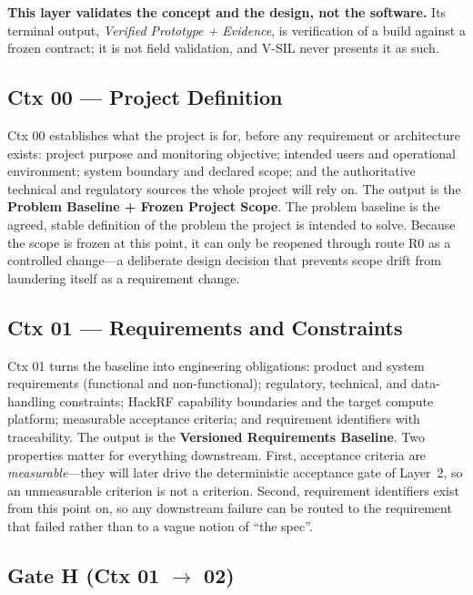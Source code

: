 \documentclass[11pt,a4paper]{article}
\begin{document}
\textbf{This layer validates the concept and the design, not the software.} Its terminal output,
\emph{Verified Prototype + Evidence}, is verification of a build against a frozen contract; it is
not field validation, and V-SIL never presents it as such.

\subsection{Ctx 00 --- Project Definition}
\label{sec:ctx00}

Ctx 00 establishes what the project is for, before any requirement or architecture exists:
project purpose and monitoring objective; intended users and operational environment; system
boundary and declared scope; and the authoritative technical and regulatory sources the whole
project will rely on. The output is the \textbf{Problem Baseline + Frozen Project Scope}. The
problem baseline is the agreed, stable definition of the problem the project is intended to
solve. Because the scope is frozen at this point, it can only be reopened through route R0 as a
controlled change---a deliberate design decision that prevents scope drift from laundering
itself as a requirement change.

\subsection{Ctx 01 --- Requirements and Constraints}
\label{sec:ctx01}

Ctx 01 turns the baseline into engineering obligations: product and system requirements
(functional and non-functional); regulatory, technical, and data-handling constraints; HackRF
capability boundaries and the target compute platform; measurable acceptance criteria; and
requirement identifiers with traceability. The output is the \textbf{Versioned Requirements
Baseline}. Two properties matter for everything downstream. First, acceptance criteria are
\emph{measurable}---they will later drive the deterministic acceptance gate of Layer~2, so an
unmeasurable criterion is not a criterion. Second, requirement identifiers exist from this point
on, so any downstream failure can be routed to the requirement that failed rather than to a
vague notion of ``the spec''.

\subsection{Gate H (Ctx 01 $\rightarrow$ 02)}
\label{sec:gate-h1}
\end{document}
